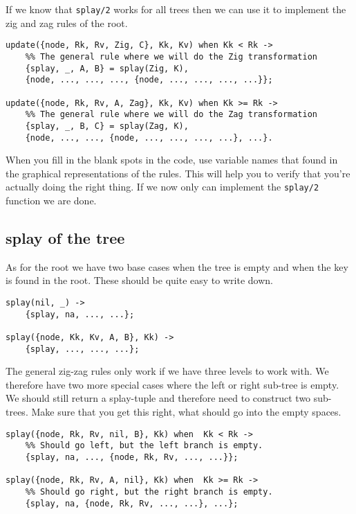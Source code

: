 \documentclass[a4paper,11pt]{article}
\begin{document}
If we know that {\tt splay/2} works for all trees then we can use it
to implement the zig and zag rules of the root.

\begin{lstlisting}
update({node, Rk, Rv, Zig, C}, Kk, Kv) when Kk < Rk ->
    %% The general rule where we will do the Zig transformation
    {splay, _, A, B} = splay(Zig, K),
    {node, ..., ..., ..., {node, ..., ..., ..., ...}};

update({node, Rk, Rv, A, Zag}, Kk, Kv) when Kk >= Rk ->
    %% The general rule where we will do the Zag transformation
    {splay, _, B, C} = splay(Zag, K),
    {node, ..., ..., {node, ..., ..., ..., ...}, ...}.
\end{lstlisting}

When you fill in the blank spots in the code, use variable names that
found in the graphical representations of the rules. This will help
you to verify that you're actually doing the right thing. If we now
only can implement the {\tt splay/2} function we are done.

\subsection{splay of the tree}

As for the root we have two base cases when the tree is empty and when the key
is found in the root. These should be quite easy to write down. 

\begin{lstlisting}
splay(nil, _) ->
    {splay, na, ..., ...};

splay({node, Kk, Kv, A, B}, Kk) ->
    {splay, ..., ..., ...};
\end{lstlisting}

The general zig-zag rules only work if we have three levels to work
with. We therefore have two more special cases where the left or right
sub-tree is empty. We should still return a splay-tuple and therefore
need to construct two sub-trees. Make sure that you get this right,
what should go into the empty spaces.

\begin{lstlisting}
splay({node, Rk, Rv, nil, B}, Kk) when  Kk < Rk ->
    %% Should go left, but the left branch is empty.
    {splay, na, ..., {node, Rk, Rv, ..., ...}};

splay({node, Rk, Rv, A, nil}, Kk) when  Kk >= Rk ->
    %% Should go right, but the right branch is empty.
    {splay, na, {node, Rk, Rv, ..., ...}, ...};
\end{lstlisting}
\end{document}
